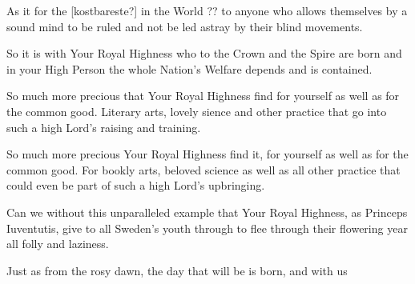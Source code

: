 
\newpage





As it for the [kostbareste?] in the World ?? to anyone who allows themselves by a
sound mind to be ruled and not be led astray by their blind
movements. 

So it is with Your Royal Highness who to the Crown and the
Spire are born and in your High Person the whole Nation's Welfare
depends and is contained. 

So much more precious that Your Royal
Highness find for yourself as well as for the common good. Literary
arts, lovely sience and other practice that go into such a high Lord's 
raising and training. 

So much more precious Your Royal Highness find
it,  for yourself as well as for the common good. For bookly arts,
beloved science as well as all other practice that could even be part of
such a high Lord's upbringing.

Can we without this unparalleled example that Your Royal Highness, as
Princeps Iuventutis, give to all Sweden's youth through to flee
through their flowering year all folly and laziness. 

Just as from the rosy dawn, the day that will be is born, and with us 